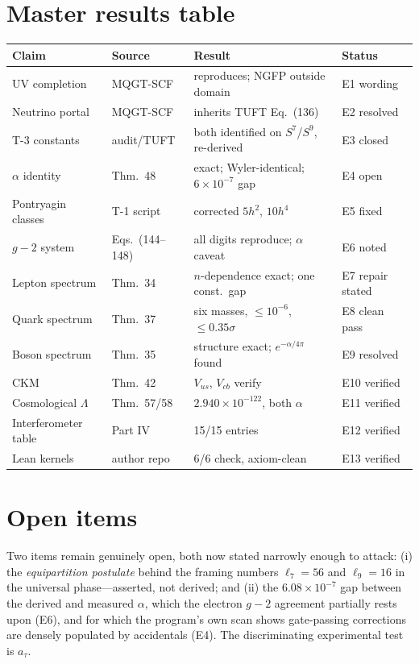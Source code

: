 \documentclass[11pt,letterpaper]{article}
\newcommand{\Sp}[1]{S^{#1}}
\begin{document}
\section{Master results table}

\begin{longtable}{@{}llll@{}}
\toprule
Claim & Source & Result & Status \\
\midrule
\endhead
UV completion & MQGT-SCF & reproduces; NGFP outside domain & E1 wording \\
Neutrino portal & MQGT-SCF & inherits TUFT Eq.~(136) & E2 resolved \\
T-3 constants & audit/TUFT & both identified on $\Sp7$/$\Sp9$, re-derived & E3 closed \\
$\alpha$ identity & Thm.~48 & exact; Wyler-identical; $6\times10^{-7}$ gap & E4 open \\
Pontryagin classes & T-1 script & corrected $5h^2$, $10h^4$ & E5 fixed \\
$g-2$ system & Eqs.~(144--148) & all digits reproduce; $\alpha$ caveat & E6 noted \\
Lepton spectrum & Thm.~34 & $n$-dependence exact; one const.\ gap & E7 repair stated \\
Quark spectrum & Thm.~37 & six masses, $\le10^{-6}$, $\le0.35\sigma$ & E8 clean pass \\
Boson spectrum & Thm.~35 & structure exact; $e^{-\alpha/4\pi}$ found & E9 resolved \\
CKM & Thm.~42 & $V_{us}$, $V_{cb}$ verify & E10 verified \\
Cosmological $\Lambda$ & Thm.~57/58 & $2.940\times10^{-122}$, both $\alpha$ & E11 verified \\
Interferometer table & Part IV & 15/15 entries & E12 verified \\
Lean kernels & author repo & 6/6 check, axiom-clean & E13 verified \\
\bottomrule
\end{longtable}

\section{Open items}

Two items remain genuinely open, both now stated narrowly enough to attack:
(i) the \emph{equipartition postulate} behind the framing numbers $\ell_7=56$
and $\ell_9=16$ in the universal phase---asserted, not derived; and (ii) the
$6.08\times10^{-7}$ gap between the derived and measured $\alpha$, which the
electron $g-2$ agreement partially rests upon (E6), and for which the
program's own scan shows gate-passing corrections are densely populated by
accidentals (E4). The discriminating experimental test is $a_\tau$.
\end{document}
